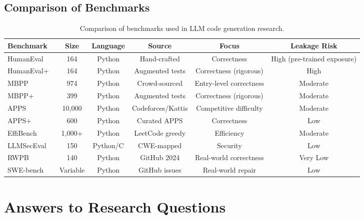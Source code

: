 \documentclass[11pt,a4paper]{article}
\begin{document}
\subsection{Comparison of Benchmarks}

\begin{table}[H]
\centering
\caption{Comparison of benchmarks used in LLM code generation research.}
\label{tab:cmp_benchmarks}
\scriptsize
\begin{tabular}{@{}lccccc@{}}
\toprule
\textbf{Benchmark} & \textbf{Size} & \textbf{Language} & \textbf{Source} & \textbf{Focus} & \textbf{Leakage Risk} \\
\midrule
HumanEval~\cite{chen2021humaneval} & 164 & Python & Hand-crafted & Correctness & High (pre-trained exposure) \\
HumanEval+~\cite{chen2021humaneval} & 164 & Python & Augmented tests & Correctness (rigorous) & High \\
MBPP~\cite{austin2021mbpp} & 974 & Python & Crowd-sourced & Entry-level correctness & Moderate \\
MBPP+~\cite{austin2021mbpp} & 399 & Python & Augmented tests & Correctness (rigorous) & Moderate \\
APPS~\cite{hendrycks2021apps} & 10{,}000 & Python & Codeforces/Kattis & Competitive difficulty & Moderate \\
APPS+~\cite{dou2026} & 600 & Python & Curated APPS & Correctness & Low \\
EffiBench~\cite{jonnala2025} & 1{,}000+ & Python & LeetCode greedy & Efficiency & Moderate \\
LLMSecEval~\cite{bruni2025} & 150 & Python/C & CWE-mapped & Security & Low \\
RWPB~\cite{dou2026} & 140 & Python & GitHub 2024 & Real-world correctness & Very Low \\
SWE-bench & Variable & Python & GitHub issues & Real-world repair & Low \\
\bottomrule
\end{tabular}
\end{table}

\section{Answers to Research Questions}
\label{sec:answers}
\end{document}

